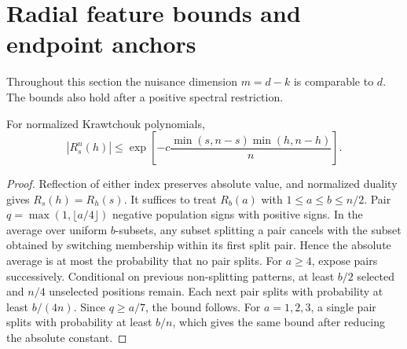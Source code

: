 \section{Radial feature bounds and endpoint anchors}
\label{sec:radial-geometry}
Throughout this section the nuisance dimension $m=d-k$ is comparable
to $d$. The bounds also hold after a positive spectral restriction.

\begin{lemma}\label{lem:uniform-kraw}
For normalized Krawtchouk polynomials,
\[
 |R_s^n(h)|\le
 \exp\left[-c\frac{\min(s,n-s)\min(h,n-h)}n\right].
\]
\end{lemma}
\begin{proof}
Reflection of either index preserves absolute value, and normalized
duality gives $R_s(h)=R_h(s)$. It suffices to treat $R_b(a)$ with
$1\le a\le b\le n/2$. Pair $q=\max(1,\lfloor a/4\rfloor)$ negative
population signs with positive signs. In the average over uniform
$b$-subsets, any subset splitting a pair cancels with the subset obtained
by switching membership within its first split pair. Hence the absolute
average is at most the probability that no pair splits.
For $a\ge4$, expose pairs successively. Conditional on previous
non-splitting patterns, at least $b/2$ selected and $n/4$ unselected
positions remain. Each next pair splits with probability at least
$b/(4n)$. Since $q\ge a/7$, the bound follows. For $a=1,2,3$, a single
pair splits with probability at least $b/n$, which gives the same bound
after reducing the absolute constant.
\end{proof}

